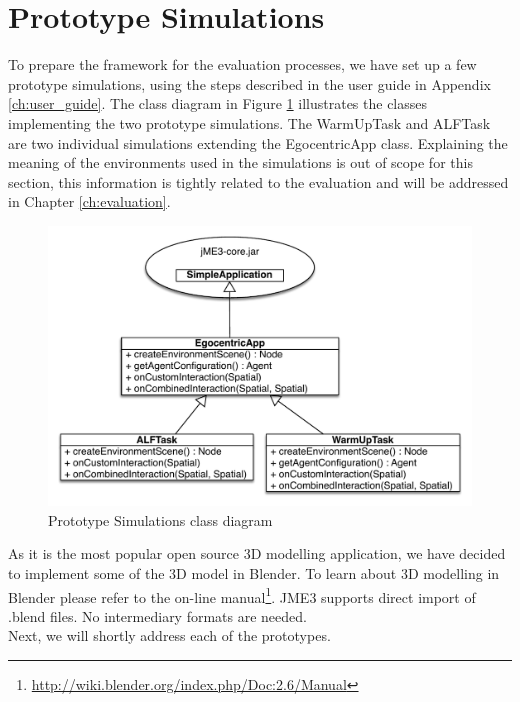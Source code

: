 \section{Prototype Simulations} %
\label{sec:impl_prototype_simulations}
To prepare the framework for the evaluation processes, we have set up a few prototype simulations, using the steps described in the user guide in Appendix \ref{ch:user_guide}. The class diagram in Figure \ref{fig:impl_prototype_simulations} illustrates the classes implementing the two prototype simulations. The WarmUpTask and ALFTask are two individual simulations extending the EgocentricApp class. Explaining the meaning of the environments used in the simulations is out of scope for this section, this information is tightly related to the evaluation and will be addressed in Chapter \ref{ch:evaluation}.
\begin{figure}[H]
	\centering
	\includegraphics[width=\linewidth]{gfx/Chapter4/prototype_simulations}
	\caption{Prototype Simulations class diagram}
	\label{fig:impl_prototype_simulations}
\end{figure}

As it is the most popular open source 3D modelling application, we have decided to implement some of the 3D model in Blender. To learn about 3D modelling in Blender please refer to the on-line manual\footnote{\url{http://wiki.blender.org/index.php/Doc:2.6/Manual}}. JME3 supports direct import of .blend files. No intermediary formats are needed.\\

Next, we will shortly address each of the prototypes.
